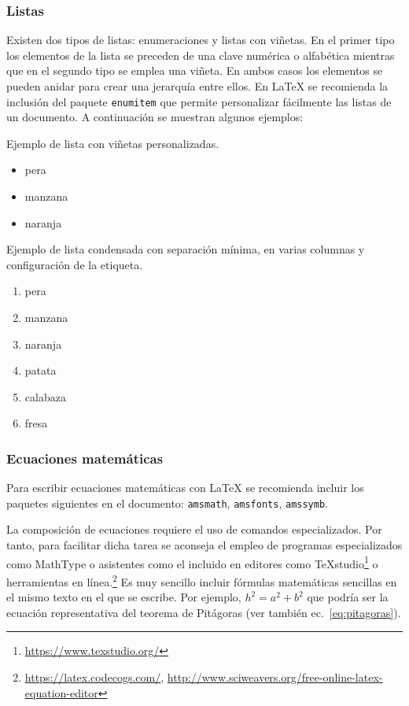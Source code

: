 \subsubsection{Listas}
\label{sec:ejListas}
Existen dos tipos de listas: enumeraciones y listas con viñetas. En el primer tipo los elementos de la lista se preceden de una clave numérica o alfabética mientras que en el segundo tipo se emplea una viñeta. En ambos casos los elementos se pueden anidar para crear una jerarquía entre ellos. En \LaTeX{} se recomienda la inclusión del paquete \texttt{enumitem} que permite personalizar fácilmente las listas de un documento. A continuación se muestran algunos ejemplos:


\noindent Ejemplo de lista con viñetas personalizadas. 
\begin{itemize}
	\item pera
	\item[\ding{43}] manzana %
	\item[\faAward] naranja
\end{itemize}


\noindent Ejemplo de lista condensada con separación mínima, en varias columnas y configuración de la etiqueta.
\begin{multicols}{2} %
	\begin{enumerate}[(1),noitemsep]
		\item pera
		\item manzana
		\item naranja
		\item patata
		\item calabaza
		\item fresa
	\end{enumerate}
\end{multicols}





\subsubsection{Ecuaciones matemáticas}
Para escribir ecuaciones matemáticas con \LaTeX{} se recomienda incluir los paquetes siguientes en el documento: \texttt{amsmath}, \texttt{amsfonts}, \texttt{amssymb}. 

La composición de ecuaciones requiere el uso de comandos especializados. Por tanto, para facilitar dicha tarea se aconseja el empleo de programas especializados como \textsf{MathType} o asistentes como el incluido en editores como \TeX studio\footnote{\url{https://www.texstudio.org/}} o herramientas en línea.\footnote{\url{https://latex.codecogs.com/},  \url{http://www.sciweavers.org/free-online-latex-equation-editor}} Es muy sencillo incluir fórmulas matemáticas sencillas en el mismo texto en el que se escribe. Por ejemplo, $h^{2}=a^{2}+b^{2}$ que podría ser la ecuación representativa del teorema de Pitágoras (ver también ec.~\ref{eq:pitagoras}).

